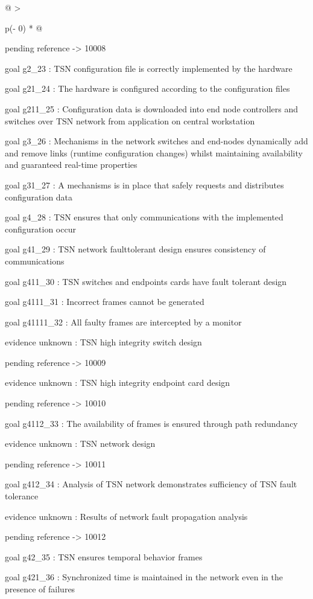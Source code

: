 \documentclass[12pt,twoside,a4paper]{article}
\begin{document}
\begin{longtable}[]{@{}
  >{\raggedright\arraybackslash}p{(\columnwidth - 0\tabcolsep) * }@{}}
\begin{minipage}[b]{\linewidth}
pending reference -\textgreater{} 10008

goal g2\_23 : TSN configuration file is correctly implemented by the hardware

goal g21\_24 : The hardware is configured according to the configuration files

goal g211\_25 : Configuration data is downloaded into end node controllers and switches over TSN network from application on central workstation

goal g3\_26 : Mechanisms in the network switches and end-nodes dynamically add and remove links (runtime configuration changes) whilst maintaining availability and guaranteed real-time properties

goal g31\_27 : A mechanisms is in place that safely requests and distributes configuration data

goal g4\_28 : TSN ensures that only communications with the implemented configuration occur

goal g41\_29 : TSN network faulttolerant design ensures consistency of communications

goal g411\_30 : TSN switches and endpoints cards have fault tolerant design

goal g4111\_31 : Incorrect frames cannot be generated

goal g41111\_32 : All faulty frames are intercepted by a monitor

evidence unknown : TSN high integrity switch design

pending reference -\textgreater{} 10009

evidence unknown : TSN high integrity endpoint card design

pending reference -\textgreater{} 10010

goal g4112\_33 : The availability of frames is ensured through path redundancy

evidence unknown : TSN network design

pending reference -\textgreater{} 10011

goal g412\_34 : Analysis of TSN network demonstrates sufficiency of TSN fault tolerance

evidence unknown : Results of network fault propagation analysis

pending reference -\textgreater{} 10012

goal g42\_35 : TSN ensures temporal behavior frames

goal g421\_36 : Synchronized time is maintained in the network even in the presence of failures


\end{minipage}
\end{longtable}
\end{document}
